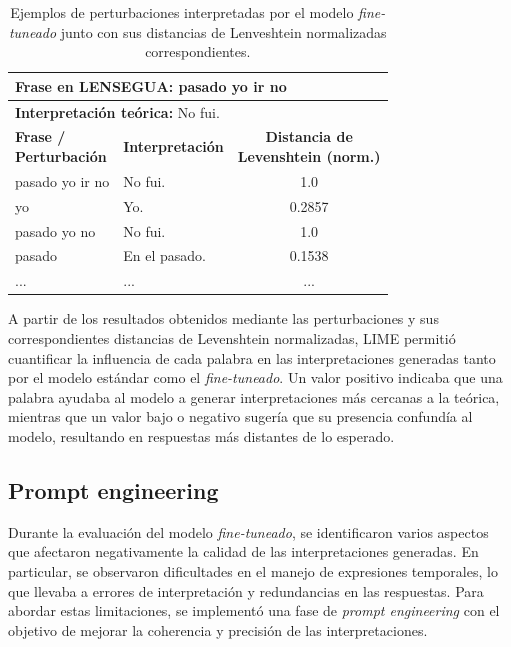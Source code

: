 \vspace{0.5cm}
\begin{table}[h!]
\centering
\begin{tabular}{|l|l|c|}
\hline
        \multicolumn{3}{|l|}{\textbf{Frase en LENSEGUA:} pasado yo ir no} \\ \hline
        \multicolumn{3}{|l|}{\textbf{Interpretación teórica:} No fui.} \\ \hline \hline
        \parbox{3cm}{\centering \textbf{Frase /} \\ \textbf{Perturbación}} & \textbf{Interpretación} & \parbox{4cm}{\centering \textbf{Distancia de} \\ \textbf{Levenshtein (norm.)}} \\ \hline
        pasado yo ir no        & No fui.                           & 1.0            \\ \hline
        yo                     & Yo.                           & 0.2857         \\ \hline
        pasado yo no           & No fui.                           & 1.0            \\ \hline
        pasado                 & En el pasado.                     & 0.1538         \\ \hline
        ...                     & ...                               & ...         \\ \hline
\end{tabular}
\caption{Ejemplos de perturbaciones interpretadas por el modelo \textit{fine-tuneado} junto con sus distancias de Lenveshtein normalizadas correspondientes.}
\label{tab:LIME}
\end{table}

A partir de los resultados obtenidos mediante las perturbaciones y sus correspondientes distancias de Levenshtein normalizadas, LIME permitió cuantificar la influencia de cada palabra en las interpretaciones generadas tanto por el modelo estándar como el \textit{fine-tuneado}. Un valor positivo indicaba que una palabra ayudaba al modelo a generar interpretaciones más cercanas a la teórica, mientras que un valor bajo o negativo sugería que su presencia confundía al modelo, resultando en respuestas más distantes de lo esperado. 



\subsection{Prompt engineering}

Durante la evaluación del modelo \textit{fine-tuneado}, se identificaron varios aspectos que afectaron negativamente la calidad de las interpretaciones generadas. En particular, se observaron dificultades en el manejo de expresiones temporales, lo que llevaba a errores de interpretación y redundancias en las respuestas. Para abordar estas limitaciones, se implementó una fase de \textit{prompt engineering} con el objetivo de mejorar la coherencia y precisión de las interpretaciones.

